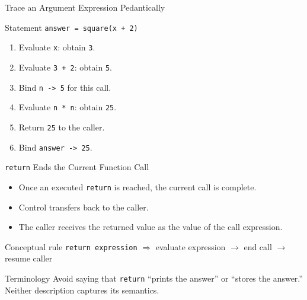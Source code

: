 \documentclass[aspectratio=169,10pt]{beamer}
\begin{document}
\begin{frame}{Trace an Argument Expression Pedantically}
  \begin{block}{Statement}
    \centering
    \Large\texttt{answer = square(x + 2)}
  \end{block}

  \begin{enumerate}
    \item Evaluate \texttt{x}: obtain \texttt{3}.
    \item Evaluate \texttt{3 + 2}: obtain \texttt{5}.
    \item Bind \texttt{n -> 5} for this call.
    \item Evaluate \texttt{n * n}: obtain \texttt{25}.
    \item Return \texttt{25} to the caller.
    \item Bind \texttt{answer -> 25}.
  \end{enumerate}
\end{frame}


\begin{frame}{\texttt{return} Ends the Current Function Call}
  \begin{itemize}
    \item Once an executed \texttt{return} is reached, the current call is complete.
    \item Control transfers back to the caller.
    \item The caller receives the returned value as the value of the call expression.
  \end{itemize}

  \begin{block}{Conceptual rule}
    \centering
    \texttt{return expression}
    $\Longrightarrow$
    evaluate expression $\rightarrow$ end call $\rightarrow$ resume caller
  \end{block}

  \begin{alertblock}{Terminology}
    Avoid saying that \texttt{return} ``prints the answer'' or ``stores the answer.'' Neither description captures its semantics.
  \end{alertblock}
\end{frame}
\end{document}
